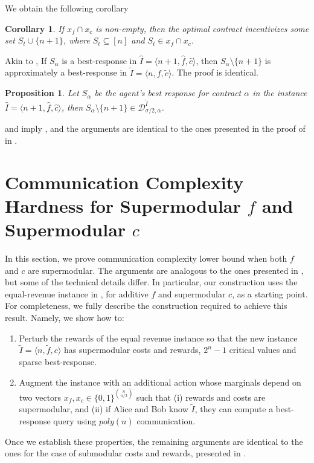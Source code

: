 \documentclass[11pt]{article}
\newtheorem{corollary}{Corollary}
\newtheorem{proposition}{Proposition}
\newcommand{\inst}[3]{\langle #1, #2, #3 \rangle}
\newcommand{\demand}[2]{\mathcal{D}_{{#1},{#2}}}
\newcommand{\BR}[3]{\demand{#1}{#2}^{#3}}
\newcommand{\tc}{\tilde{c}}
\newcommand{\tf}{\tilde{f}}
\newcommand{\hf}{\hat{f}}
\newcommand{\hc}{\hat{c}}
\newcommand{\tI}{\tilde{I}}
\newcommand{\InstTildeI}{\tI = \inst{n}{f}{\tc}}
\newcommand{\InstFTildeI}{\tI = \inst{n}{\tf}{c}}
\newcommand{\hI}{\hat{I}}
\newcommand{\InstHatI}{\hI = \inst{n+1}{\hf}{\hc}}
\begin{document}
We obtain the following corollary
\begin{corollary}\label{cor:opt_set_if_non_empty_intersection_sub-sup}
    If $x_f \cap x_c$ is non-empty, then the optimal contract incentivizes some set $S_t \cup \{n+1\}$, where $S_t \subseteq [n]$ and $S_t \in x_f \cap x_c$. 
\end{corollary}

Akin to , If $S_\alpha$ is a best-response in $\InstHatI$, then $S_\alpha \setminus \{n+1\}$ is approximately a best-response in $\InstTildeI$. The proof is identical.
\begin{proposition}\label{prop:BR_in_approxDemand_sub-sup}
    Let $S_\alpha$ be the agent's best response for contract $\alpha$ in the instance $\InstHatI$, then 
    $S_\alpha \setminus\{n+1\} \in \BR{\sigma/2}{\alpha}{\tI}$.
\end{proposition}
 and  imply , and the arguments are identical to the ones presented in the proof of   in .




\section{Communication Complexity Hardness for Supermodular $f$ and Supermodular $c$}\label{sec:cc_lower_bound_supmod_f_c}

In this section, we prove communication complexity lower bound when both $f$ and $c$ are supermodular.
The arguments are analogous to the ones presented in , but some of the technical details differ. In particular, our construction uses the equal-revenue instance in , for additive $f$ and supermodular $c$, as a starting point. 
For completeness, we fully describe the construction required to achieve this result. Namely, we show how to:
\begin{enumerate}
    \item Perturb the rewards of the equal revenue instance so that the new instance $\InstFTildeI$ has supermodular costs and rewards, $2^n-1$ critical values and sparse best-response.
    \item Augment the instance with an additional action whose marginals depend on two vectors $x_f,x_c \in \{0,1\}^{\binom{n}{n/2}}$ such that (i) rewards and costs are supermodular, and (ii) if Alice and Bob know $\tI$, they can compute a best-response query using $poly(n)$ communication.
\end{enumerate}
Once we establish these properties, the remaining arguments are identical to the ones for the case of submodular costs and rewards, presented in .
    
\end{document}
